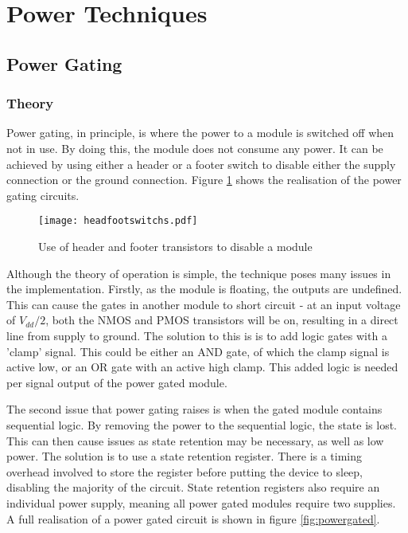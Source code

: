 
\section{Power Techniques}
\subsection{Power Gating}

\subsubsection{Theory}

Power gating, in principle, is where the power to a module is switched off when not in use. 
By doing this, the module does not consume any power. 
It can be achieved by using either a header or a footer switch to disable either the supply connection or the ground connection. 
Figure \ref{fig:powerswitches} shows the realisation of the power gating circuits.

\begin{figure}
\texttt{[image: headfootswitchs.pdf]}
\caption{Use of header and footer transistors to disable a module}
\label{fig:powerswitches}
\end{figure}

Although the theory of operation is simple, the technique poses many issues in the implementation.
Firstly, as the module is floating, the outputs are undefined.
This can cause the gates in another module to short circuit - at an input voltage of $ V_{dd} / 2 $, both the NMOS and PMOS transistors will be on, resulting in a direct line from supply to ground. 
The solution to this is is to add logic gates with a 'clamp' signal. 
This could be either an AND gate, of which the clamp signal is active low, or an OR gate with an active high clamp. 
This added logic is needed per signal output of the power gated module.

The second issue that power gating raises is when the gated module contains sequential logic. 
By removing the power to the sequential logic, the state is lost. 
This can then cause issues as state retention may be necessary, as well as low power.
The solution is to use a state retention register. 
There is a timing overhead involved to store the register before putting the device to sleep, disabling the majority of the circuit. 
State retention registers also require an individual power supply, meaning all power gated modules require two supplies.
A full realisation of a power gated circuit is shown in figure \ref{fig:powergated}. 


